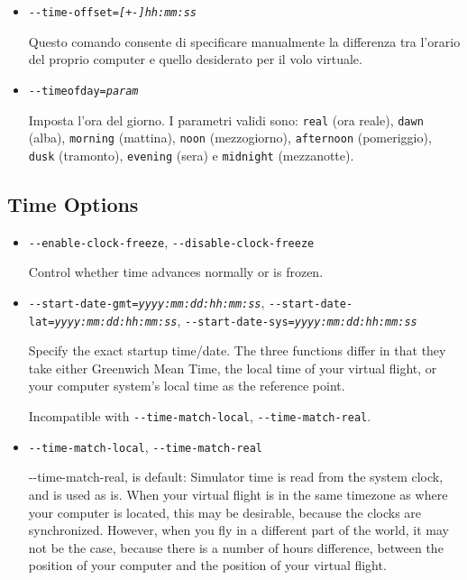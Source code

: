 \begin{itemize}
{\begin{itemize}
  Incompatibile con \texttt{-$ $-start-date-gmt}, \texttt{-$ $-start-date-lat}, \texttt{-$ $-start-date-sys}.

  \item{\texttt{-$ $-time-offset={\it [+-]hh:mm:ss}}}

  Questo comando consente di specificare manualmente la differenza tra
  l'orario del proprio computer e quello desiderato per il volo virtuale.

  \item{\texttt{-$ $-timeofday={\it param}}}

  Imposta l'ora del giorno. I parametri validi sono: \texttt{real} (ora reale),
  \texttt{dawn} (alba), \texttt{morning} (mattina),
  \texttt{noon} (mezzogiorno), \texttt{afternoon} (pomeriggio),
  \texttt{dusk} (tramonto), \texttt{evening} (sera) e \texttt{midnight} (mezzanotte).

  \end{itemize}
}
{
  \subsection{Time Options}
  \begin{itemize}

  \item{\texttt{-$ $-enable-clock-freeze}, \texttt{-$ $-disable-clock-freeze}}

  Control whether time advances normally or is frozen.

  \item{\texttt{-$ $-start-date-gmt={\it yyyy:mm:dd:hh:mm:ss}},
  \texttt{-$ $-start-date-lat={\it yyyy:mm:dd:hh:mm:ss}},
  \texttt{-$ $-start-date-sys={\it yyyy:mm:dd:hh:mm:ss}}}

  Specify the exact startup time/date. The three functions differ in that they
  take either Greenwich Mean Time, the local time of your virtual flight, or
  your computer system's local time as the reference point.

  Incompatible with \texttt{-$ $-time-match-local}, \texttt{-$ $-time-match-real}.

  \item{\texttt{-$ $-time-match-local}, \texttt{-$ $-time-match-real}}

  {-$ $-time-match-real}, is default: Simulator time is read from the system clock, and
  is used as is. When your virtual flight is in the same timezone as where your computer
  is located, this may be desirable, because the clocks are synchronized. However,
  when you fly in a different part of the world, it may not be the case, because there
  is a number of hours difference, between the position of your computer and the position of your
  virtual flight.


\end{itemize}}
\end{itemize}
